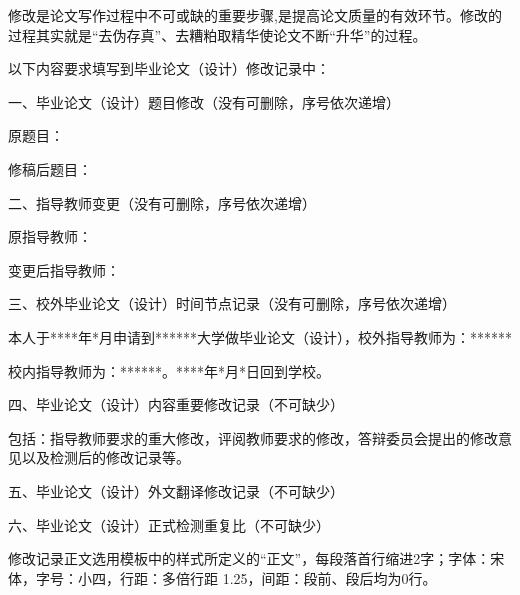  \setlength{\baselineskip}{20pt}
 \begin{modify}

修改是论文写作过程中不可或缺的重要步骤,是提高论文质量的有效环节。修改的过程其实就是“去伪存真”、去糟粕取精华使论文不断“升华”的过程。

以下内容要求填写到毕业论文（设计）修改记录中：

一、毕业论文（设计）题目修改（没有可删除，序号依次递增）

原题目：

修稿后题目：

二、指导教师变更（没有可删除，序号依次递增）

原指导教师：

变更后指导教师：

三、校外毕业论文（设计）时间节点记录（没有可删除，序号依次递增）

本人于****年*月申请到******大学做毕业论文（设计），校外指导教师为：******

校内指导教师为：******。****年*月*日回到学校。
    
四、毕业论文（设计）内容重要修改记录（不可缺少）
    
包括：指导教师要求的重大修改，评阅教师要求的修改，答辩委员会提出的修改意见以及检测后的修改记录等。
    
五、毕业论文（设计）外文翻译修改记录（不可缺少）
    
六、毕业论文（设计）正式检测重复比（不可缺少）
    
修改记录正文选用模板中的样式所定义的“正文”，每段落首行缩进2字；字体：宋体，字号：小四，行距：多倍行距 1.25，间距：段前、段后均为0行。
    

~\par
{}\par
{}


\end{modify}


